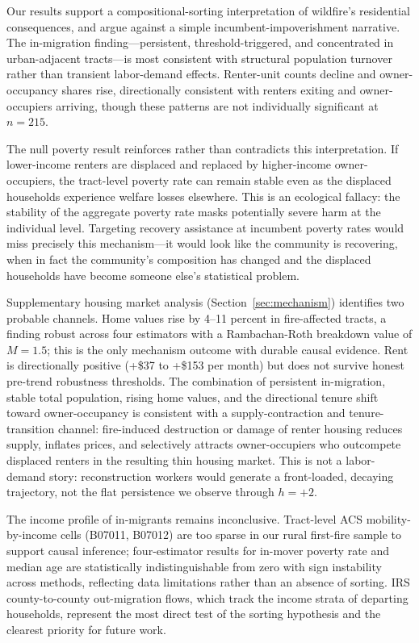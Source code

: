 \documentclass[12pt]{article}
\begin{document}
Our results support a compositional-sorting interpretation of wildfire's
residential consequences, and argue against a simple incumbent-impoverishment
narrative.
The in-migration finding---persistent, threshold-triggered,
and concentrated in urban-adjacent tracts---is most consistent with
structural population turnover rather than transient labor-demand effects.
Renter-unit counts decline and owner-occupancy shares rise, directionally
consistent with renters exiting and owner-occupiers arriving,
though these patterns are not individually significant at $n = 215$.

The null poverty result reinforces rather than contradicts this interpretation.
If lower-income renters are displaced and replaced by higher-income
owner-occupiers, the tract-level poverty rate can remain stable
even as the displaced households experience welfare losses elsewhere.
This is an ecological fallacy: the stability of the aggregate poverty rate
masks potentially severe harm at the individual level.
Targeting recovery assistance at incumbent poverty rates
would miss precisely this mechanism---it would look like the community
is recovering, when in fact the community's composition has changed
and the displaced households have become someone else's statistical problem.

Supplementary housing market analysis (Section~\ref{sec:mechanism})
identifies two probable channels.
Home values rise by 4--11 percent in fire-affected tracts, a finding robust
across four estimators with a Rambachan-Roth breakdown value of $M = 1.5$;
this is the only mechanism outcome with durable causal evidence.
Rent is directionally positive (+\$37 to +\$153 per month) but does not
survive honest pre-trend robustness thresholds.
The combination of persistent in-migration, stable total population,
rising home values, and the directional tenure shift toward owner-occupancy
is consistent with a supply-contraction and tenure-transition channel:
fire-induced destruction or damage of renter housing reduces supply,
inflates prices, and selectively attracts owner-occupiers who outcompete
displaced renters in the resulting thin housing market.
This is not a labor-demand story: reconstruction workers would generate
a front-loaded, decaying trajectory, not the flat persistence we observe
through $h = +2$.

The income profile of in-migrants remains inconclusive.
Tract-level ACS mobility-by-income cells (B07011, B07012) are too sparse
in our rural first-fire sample to support causal inference; four-estimator
results for in-mover poverty rate and median age are statistically
indistinguishable from zero with sign instability across methods,
reflecting data limitations rather than an absence of sorting.
IRS county-to-county out-migration flows, which track the income strata
of departing households, represent the most direct test of the
sorting hypothesis and the clearest priority for future work.
\end{document}
